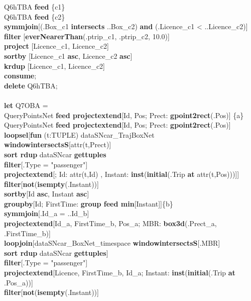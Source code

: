 \documentclass[a4paper]{article}
\newcommand{\op}[1]{\textbf{#1}}
\begin{document}
\begin{scriptsize}
\begin{tabbing}
\>Q6hTBA \op{feed} \{c1\}\\
\>Q6hTBA \op{feed} \{c2\}\\
\>\op{symmjoin}[(.Box\_c1 \op{intersects} ..Box\_c2) \op{and} (.Licence\_c1 < ..Licence\_c2)]\\
\>\op{filter} [\op{everNearerThan}(.ptrip\_c1, .ptrip\_c2, 10.0)]\\
\>\op{project} [Licence\_c1, Licence\_c2]\\
\>\op{sortby} [Licence\_c1 \op{asc}, Licence\_c2 \op{asc}]\\
\>\op{krdup} [Licence\_c1, Licence\_c2]\\
\op{consume};\\
\op{delete} Q6hTBA;\\
\\
\op{let} Q7OBA =\\
\>QueryPointsNet \op{feed projectextend}[Id, Pos; Prect: \op{gpoint2rect}(.Pos)] \{a\}\\
\>QueryPointsNet \op{feed projectextend}[Id, Pos; Prect: \op{gpoint2rect}(.Pos)]\\
\>\>\op{loopsel}[\op{fun} (t:TUPLE) dataSNcar\_TrajBoxNet \op{windowintersectsS}[attr(t,Prect)]\\
\>\>\>\>\op{sort rdup} dataSNcar \op{gettuples}\\
\>\>\>\op{filter}[.Type = "passenger"]\\
\>\>\>\op{projectextend}[; Id: attr(t,Id) , Instant: \op{inst}(\op{initial}(.Trip \op{at} attr(t,Pos)))]]\\
\>\>\>\op{filter}[\op{not}(\op{isempty}(.Instant))]\\
\>\>\>\op{sortby}[Id \op{asc}, Instant \op{asc}]\\
\>\>\>\op{groupby}[Id; FirstTime: \op{group feed min}[Instant]]\{b\}\\
\>\op{symmjoin}[.Id\_a = ..Id\_b]\\
\>\op{projectextend}[Id\_a, FirstTime\_b, Pos\_a; MBR: \op{box3d}(.Prect\_a, .FirstTime\_b)]\\
\>\op{loopjoin}[dataSNcar\_BoxNet\_timespace \op{windowintersectsS}[.MBR]\\
\>\>\>\>\op{sort rdup} dataSNcar \op{gettuples}]\\
\>\op{filter}[.Type = "passenger"]\\
\>\op{projectextend}[Licence, FirstTime\_b, Id\_a; Instant: \op{inst}(\op{initial}(.Trip \op{at} .Pos\_a))]\\
\>\op{filter}[\op{not}(\op{isempty}(.Instant))]\\

\end{tabbing}
\end{scriptsize}
\end{document}
